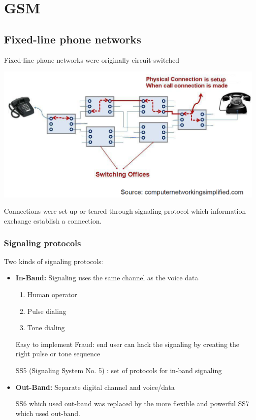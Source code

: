 
\section{GSM}

\subsection{Fixed-line phone networks}
Fixed-line phone networks were originally circuit-switched
\begin{center}
    \includegraphics[width=0.5\linewidth]{img/fixed-line.png}
\end{center}
Connections were set up or teared through signaling protocol which information
exchange establish a connection. 

\subsubsection{Signaling protocols}
Two kinds of signaling protocols:
\begin{itemize}
\item \textbf{In-Band:} Signaling uses the same channel as the voice data
        \begin{enumerate}
            \item Human operator
            \item Pulse dialing
            \item Tone dialing
        \end{enumerate}

        \begin{itemize}
                \proitem{} Easy to implement 
                \consitem{} Fraud: end user can hack the signaling by
                creating the right pulse or tone sequence
        \end{itemize}

        SS5 (Signaling System No. 5) : set of protocols for in-band
        signaling

\item \textbf{Out-Band:} Separate digital channel and voice/data

        SS6 which used out-band was replaced by the more flexible and
        powerful SS7 which used out-band.
\end{itemize}

